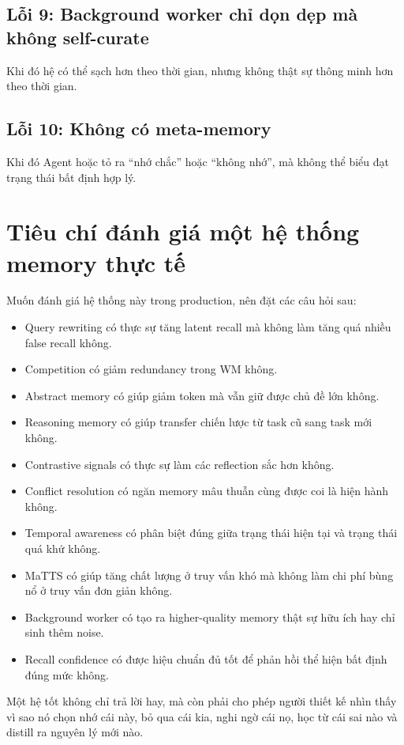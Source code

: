 \documentclass[a4paper,12pt]{article}
\begin{document}
\subsection*{Lỗi 9: Background worker chỉ dọn dẹp mà không self-curate}

Khi đó hệ có thể sạch hơn theo thời gian, nhưng không thật sự thông minh hơn theo thời gian.

\subsection*{Lỗi 10: Không có meta-memory}

Khi đó Agent hoặc tỏ ra ``nhớ chắc'' hoặc ``không nhớ'', mà không thể biểu đạt trạng thái bất định hợp lý.

\section{Tiêu chí đánh giá một hệ thống memory thực tế}

Muốn đánh giá hệ thống này trong production, nên đặt các câu hỏi sau:
\begin{itemize}
    \item Query rewriting có thực sự tăng latent recall mà không làm tăng quá nhiều false recall không.
    \item Competition có giảm redundancy trong WM không.
    \item Abstract memory có giúp giảm token mà vẫn giữ được chủ đề lớn không.
    \item Reasoning memory có giúp transfer chiến lược từ task cũ sang task mới không.
    \item Contrastive signals có thực sự làm các reflection sắc hơn không.
    \item Conflict resolution có ngăn memory mâu thuẫn cùng được coi là hiện hành không.
    \item Temporal awareness có phân biệt đúng giữa trạng thái hiện tại và trạng thái quá khứ không.
    \item MaTTS có giúp tăng chất lượng ở truy vấn khó mà không làm chi phí bùng nổ ở truy vấn đơn giản không.
    \item Background worker có tạo ra higher-quality memory thật sự hữu ích hay chỉ sinh thêm noise.
    \item Recall confidence có được hiệu chuẩn đủ tốt để phản hồi thể hiện bất định đúng mức không.
\end{itemize}

Một hệ tốt không chỉ trả lời hay, mà còn phải cho phép người thiết kế nhìn thấy vì sao nó chọn nhớ cái này, bỏ qua cái kia, nghi ngờ cái nọ, học từ cái sai nào và distill ra nguyên lý mới nào.
\end{document}
